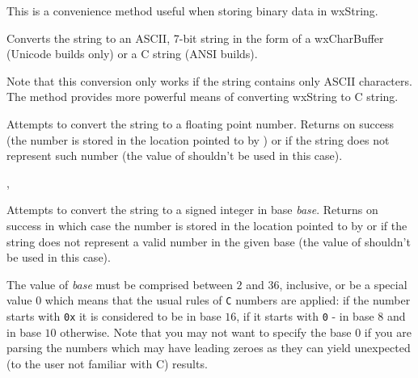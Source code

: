 This is a convenience method useful when storing binary data in wxString.





\label{wxstringtoascii}



Converts the string to an ASCII, 7-bit string in the form of
a wxCharBuffer (Unicode builds only) or a C string (ANSI builds).

Note that this conversion only works if the string contains only ASCII
characters. The  method provides more
powerful means of converting wxString to C string.


\label{wxstringtodouble}


Attempts to convert the string to a floating point number. Returns \true on
success (the number is stored in the location pointed to by ) or \false
if the string does not represent such number (the value of  shouldn't
be used in this case).


,\\


\label{wxstringtolong}


Attempts to convert the string to a signed integer in base {\it base}. Returns
\true on success in which case the number is stored in the location
pointed to by  or \false if the string does not represent a
valid number in the given base (the value of  shouldn't
be used in this case).

The value of {\it base} must be comprised between $2$ and $36$, inclusive, or
be a special value $0$ which means that the usual rules of {\tt C} numbers are
applied: if the number starts with {\tt 0x} it is considered to be in base
$16$, if it starts with {\tt 0} - in base $8$ and in base $10$ otherwise. Note
that you may not want to specify the base $0$ if you are parsing the numbers
which may have leading zeroes as they can yield unexpected (to the user not
familiar with C) results.

